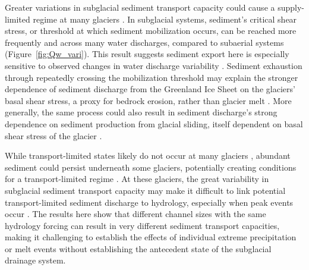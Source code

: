 \documentclass[tc, manuscript]{copernicus}
\begin{document}
Greater variations in subglacial sediment transport capacity could cause a supply-limited regime at many glaciers \citep{alley1997}.
In subglacial systems, sediment's critical shear stress, or threshold at which sediment mobilization occurs, can be reached more frequently and across many water discharges, compared to subaerial systems (Figure~\ref{fig:Qw_vari}).
This result suggests sediment export here is especially sensitive to observed changes in water discharge variability \citep{lane2019b}.
Sediment exhaustion through repeatedly crossing the mobilization threshold may explain the stronger dependence of sediment discharge from the Greenland Ice Sheet on the glaciers' basal shear stress, a proxy for bedrock erosion, rather than glacier melt \citep{overeem2017}.
More generally, the same process could also result in sediment discharge's strong dependence on sediment production from glacial sliding, itself dependent on basal shear stress of the glacier \citep{herman2015,koppes2015}.

While transport-limited states likely do not occur at many glaciers \citep[e.g.][]{alley1997}, abundant sediment could persist underneath some glaciers, potentially creating conditions for a transport-limited regime \citep[e.g.][]{walter2014,stevens2022,delaney2022}.
At these glaciers, the great variability in subglacial sediment transport capacity may make it difficult to link potential transport-limited sediment discharge to hydrology, especially when peak events occur \citep{cowan1988,delaney2018,lu2022}.
The results here show that different channel sizes with the same hydrology forcing can result in very different sediment transport capacities, making it challenging to establish the effects of individual extreme precipitation or melt events without establishing the antecedent state of the subglacial drainage system.
\end{document}
